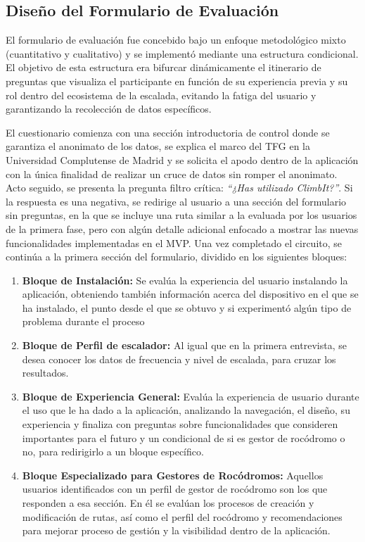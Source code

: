 \subsection{Diseño del Formulario de Evaluación}

El formulario de evaluación fue concebido bajo un enfoque metodológico mixto (cuantitativo y cualitativo) y se implementó mediante una estructura condicional. El objetivo de esta estructura era bifurcar dinámicamente el itinerario de preguntas que visualiza el participante en función de su experiencia previa y su rol dentro del ecosistema de la escalada, evitando la fatiga del usuario y garantizando la recolección de datos específicos.

El cuestionario comienza con una sección introductoria de control donde se garantiza el anonimato de los datos, se explica el marco del TFG en la Universidad Complutense de Madrid y se solicita el apodo dentro de la aplicación con la única finalidad de realizar un cruce de datos sin romper el anonimato. Acto seguido, se presenta la pregunta filtro crítica: \textit{``¿Has utilizado ClimbIt?''}. Si la respuesta es una negativa, se redirige al usuario a una sección del formulario sin preguntas, en la que se incluye una ruta similar a la evaluada por los usuarios de la primera fase, pero con algún detalle adicional enfocado a mostrar las nuevas funcionalidades implementadas en el MVP. Una vez completado el circuito, se continúa a la primera sección del formulario, dividido en los siguientes bloques:

\begin{enumerate}
    \item \textbf{Bloque de Instalación:} Se evalúa la experiencia del usuario instalando la aplicación, obteniendo también información acerca del dispositivo en el que se ha instalado, el punto desde el que se obtuvo y si experimentó algún tipo de problema durante el proceso
    \item \textbf{Bloque de Perfil de escalador:} Al igual que en la primera entrevista, se desea conocer los datos de frecuencia y nivel de escalada, para cruzar los resultados. 
    \item \textbf{Bloque de Experiencia General:} Evalúa la experiencia de usuario durante el uso que le ha dado a la aplicación, analizando la navegación, el diseño, su experiencia y finaliza con preguntas sobre funcionalidades que consideren importantes para el futuro y un condicional de si es gestor de rocódromo o no, para redirigirlo a un bloque específico.
    \item \textbf{Bloque Especializado para Gestores de Rocódromos:} Aquellos usuarios identificados con un perfil de gestor de rocódromo son los que responden a esa sección. En él se evalúan los procesos de creación y modificación de rutas, así como el perfil del rocódromo y recomendaciones para mejorar proceso de gestión y la visibilidad dentro de la aplicación.
\end{enumerate}

